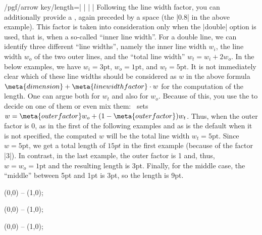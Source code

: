 \begin{key}{/pgf/arrow key/length=| |%
    | |}
  Following the line width factor, you can additionally provide a
  , again preceded by a space (the |0.8| in the
  above example). This factor is
  taken into consideration only when the |double| option is used, that
  is, when a so-called ``inner line width''. For a double line, we can
  identify three different ``line widths'', namely the inner line
  width $w_i$, the line width  $w_o$ of the two outer lines, and the
  ``total line width'' $w_t = w_i + 2w_o$. In the below examples, we
  have $w_i = 3\mathrm{pt}$, $w_o=1\mathrm{pt}$, and $w_t =
  5\mathrm{pt}$. It is not immediately clear 
  which of these line widths should be considered as $w$ in the above
  formula $\meta{dimension} + \meta{line width factor}\cdot w$ for the
  computation of the length. One can argue both for $w_t$ and also for
  $w_o$. Because of this, you use the  to
  decide on one of them or even 
  mix them: \tikzname\ sets $w = \meta{outer factor} w_o +
  (1-\meta{outer factor})w_t$. Thus, when the outer factor is $0$, as
  in the first of the following examples and as is the default when it
  is not specified, the computed $w$ will be the total
  line width $w_t = 5\mathrm{pt}$. Since
  $w=5\mathrm{pt}$, we get a total length of $15pt$ in the first
  example (because of the factor |3|). In contrast, in the last
  example, the outer factor is 1 and, thus, $w = w_o = \mathrm{1pt}$ and the
  resulting length is 3pt. Finally, for the middle case, the ``middle'' between 5pt and
  1pt is 3pt, so the length is 9pt.
\begin{codeexample}[]
\tikz \draw [line width=1pt, double distance=3pt,
             arrows = {-Latex[length=0pt 3 0]}] (0,0) -- (1,0);
\end{codeexample}
\begin{codeexample}[]
\tikz \draw [line width=1pt, double distance=3pt,
             arrows = {-Latex[length=0pt 3 .5]}] (0,0) -- (1,0);
\end{codeexample}
\begin{codeexample}[]
\tikz \draw [line width=1pt, double distance=3pt,
             arrows = {-Latex[length=0pt 3 1]} ] (0,0) -- (1,0);
\end{codeexample}


\end{key}
